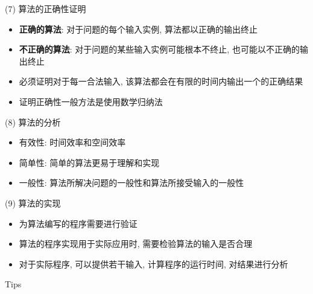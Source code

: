 \documentclass[fontset=fandol,UTF8,12pt,aspectratio=169,fleqn]{beamer}
\begin{document}
\begin{frame}{(7) 算法的正确性证明}
\begin{itemize}[<+-|alert@+>]
\item \textbf{正确的算法}: 对于问题的每个输入实例, 算法都以正确的输出终止  
\item \textbf{不正确的算法}: 对于问题的某些输入实例可能根本不终止, 也可能以不正确的输出终止  
\item 必须证明对于每一合法输入, 该算法都会在有限的时间内输出一个的正确结果   
\item 证明正确性一般方法是使用数学归纳法   
% 
\end{itemize}
\end{frame}

\begin{frame}{(8) 算法的分析}
\begin{itemize}[<+-|alert@+>]
\item 有效性: 时间效率和空间效率   
\item 简单性: 简单的算法更易于理解和实现   
\item 一般性: 算法所解决问题的一般性和算法所接受输入的一般性   
\end{itemize}
\end{frame}

\begin{frame}{(9) 算法的实现}
\begin{itemize}[<+-|alert@+>]
\item 为算法编写的程序需要进行验证   
\item 算法的程序实现用于实际应用时, 需要检验算法的输入是否合理   
\item 对于实际程序, 可以提供若干输入, 计算程序的运行时间, 对结果进行分析   
\end{itemize}
\end{frame}

\begin{frame}{Tips}

\end{frame}
\end{document}
